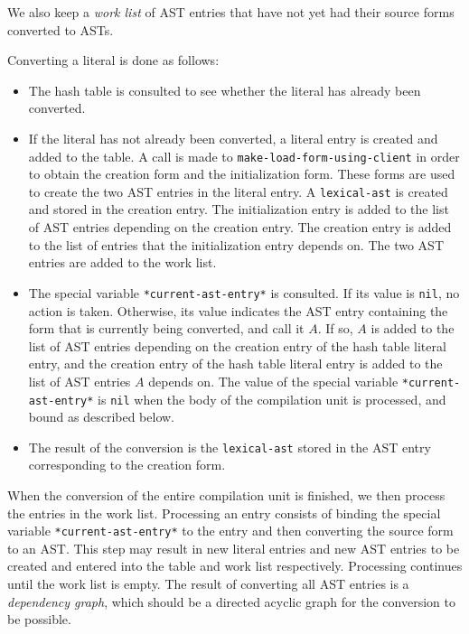 We also keep a \emph{work list} of AST entries that have not yet had
their source forms converted to ASTs.

Converting a literal is done as follows:

\begin{itemize}
\item The hash table is consulted to see whether the literal has
  already been converted.
\item If the literal has not already been converted, a literal entry
  is created and added to the table.  A call is made to
  \texttt{make-load-form-using-client} in order to obtain the creation
  form and the initialization form.  These forms are used to create
  the two AST entries in the literal entry.  A \texttt{lexical-ast} is
  created and stored in the creation entry.  The initialization entry
  is added to the list of AST entries depending on the creation entry.
  The creation entry is added to the list of entries that the
  initialization entry depends on. The two AST entries are added to
  the work list.
\item The special variable \texttt{*current-ast-entry*} is consulted.
  If its value is \texttt{nil}, no action is taken.  Otherwise, its
  value indicates the AST entry containing the form that is currently
  being converted, and call it $A$.  If so, $A$ is added to the list
  of AST entries depending on the creation entry of the hash table
  literal entry, and the creation entry of the hash table literal
  entry is added to the list of AST entries $A$ depends on.  The value
  of the special variable \texttt{*current-ast-entry*} is \texttt{nil}
  when the body of the compilation unit is processed, and bound as
  described below.
\item The result of the conversion is the \texttt{lexical-ast} stored
  in the AST entry corresponding to the creation form.
\end{itemize}

When the conversion of the entire compilation unit is finished, we
then process the entries in the work list.  Processing an entry
consists of binding the special variable \texttt{*current-ast-entry*}
to the entry and then converting the source form to an AST.  This step
may result in new literal entries and new AST entries to be created
and entered into the table and work list respectively.  Processing
continues until the work list is empty.  The result of converting all
AST entries is a \emph{dependency graph}, which should be a directed
acyclic graph for the conversion to be possible.

